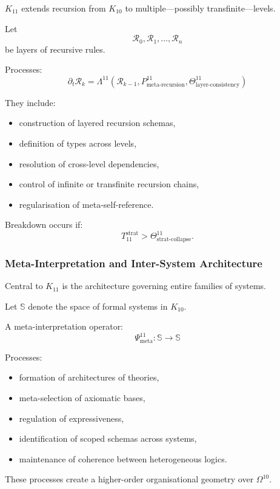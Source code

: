 $K_{11}$ extends recursion from $K_{10}$ to multiple—possibly transfinite—levels.

Let 
\[
\mathcal{R}_0, \mathcal{R}_1, \ldots, \mathcal{R}_n
\]
be layers of recursive rules.

Processes:
\[
\partial_t \mathcal{R}_k 
= \Lambda^{11}(\mathcal{R}_{k-1}, 
               P^{11}_{\text{meta-recursion}}, 
               \Theta^{11}_{\text{layer-consistency}})
\]

They include:
\begin{itemize}
    \item construction of layered recursion schemas,
    \item definition of types across levels,
    \item resolution of cross-level dependencies,
    \item control of infinite or transfinite recursion chains,
    \item regularisation of meta-self-reference.
\end{itemize}

Breakdown occurs if:
\[
T_{11}^{\text{strat}} > \Theta^{11}_{\text{strat-collapse}}.
\]

\subsubsection{Meta-Interpretation and Inter-System Architecture}

Central to $K_{11}$ is the architecture governing entire families of systems.

Let $\mathbb{S}$ denote the space of formal systems in $K_{10}$.

A meta-interpretation operator:
\[
\Psi^{11}_{\text{meta}} : \mathbb{S} \to \mathbb{S}
\]

Processes:
\begin{itemize}
    \item formation of architectures of theories,
    \item meta-selection of axiomatic bases,
    \item regulation of expressiveness,
    \item identification of scoped schemas across systems,
    \item maintenance of coherence between heterogeneous logics.
\end{itemize}

These processes create a higher-order organisational geometry over $\Omega^{10}$.

